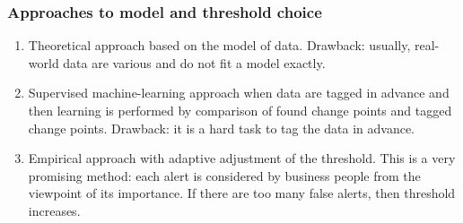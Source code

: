 \documentclass[intlimits, 9pt, unicode]{beamer}
\begin{document}
	








\begin{frame}
    \frametitle{Approaches to model and threshold choice}

\begin{enumerate}
\item 
Theoretical approach based on the model of data. Drawback: usually, real-world data are various and do not fit a model exactly.

\bigskip
\item
Supervised machine-learning approach when data are tagged in advance and then learning is performed by comparison of found change points and tagged change points. Drawback: it is a hard task to tag the data in advance.

\bigskip
\item
Empirical approach with adaptive adjustment of the threshold. This is a very promising method:
each alert is considered by business people from the viewpoint of its
importance. If there are too many false alerts, then threshold increases. 
\end{enumerate}

%
%

 \end{frame}
\end{document}

